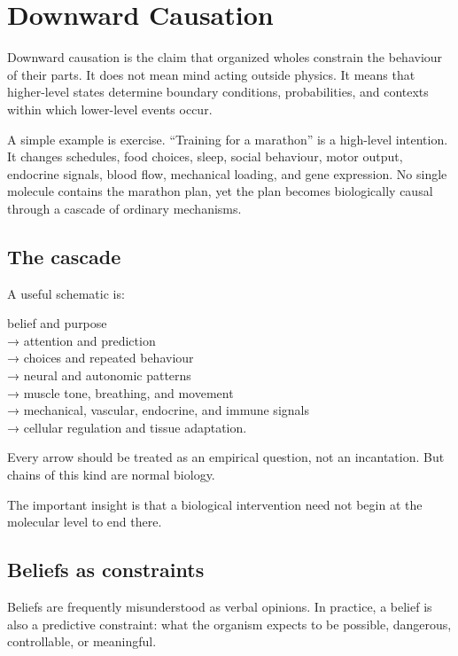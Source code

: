 \chapter{Downward Causation}

Downward causation is the claim that organized wholes constrain the behaviour of their parts. It does not mean mind acting outside physics. It means that higher-level states determine boundary conditions, probabilities, and contexts within which lower-level events occur.

A simple example is exercise. ``Training for a marathon'' is a high-level intention. It changes schedules, food choices, sleep, social behaviour, motor output, endocrine signals, blood flow, mechanical loading, and gene expression. No single molecule contains the marathon plan, yet the plan becomes biologically causal through a cascade of ordinary mechanisms.

\section{The cascade}

A useful schematic is:

belief and purpose\\
→ attention and prediction\\
→ choices and repeated behaviour\\
→ neural and autonomic patterns\\
→ muscle tone, breathing, and movement\\
→ mechanical, vascular, endocrine, and immune signals\\
→ cellular regulation and tissue adaptation.

Every arrow should be treated as an empirical question, not an incantation. But chains of this kind are normal biology.

The important insight is that a biological intervention need not begin at the molecular level to end there.

\section{Beliefs as constraints}

Beliefs are frequently misunderstood as verbal opinions. In practice, a belief is also a predictive constraint: what the organism expects to be possible, dangerous, controllable, or meaningful.

